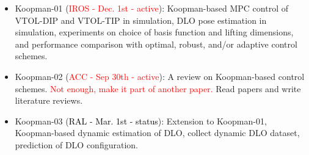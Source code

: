 \documentclass[11pt]{article}
\begin{document}
\begin{itemize}
  \item Koopman-01 (\textcolor{red}{IROS - Dec. 1st - active}):
  Koopman-based MPC control of VTOL-DIP and VTOL-TIP in simulation,
  DLO pose estimation in simulation,
  experiments on choice of basis function and lifting dimensions,
  and performance comparison with optimal, robust, and/or
  adaptive control schemes.\
  \item Koopman-02 (\textcolor{red}{ACC - Sep 30th - active}):
  A review on Koopman-based control schemes. \textcolor{red}{Not enough, make
  it part of another paper.} Read papers and write literature reviews.\

  \item Koopman-03 (\textcolor{black}{RAL - Mar. 1st - status}):
  Extension to Koopman-01, Koopman-based dynamic estimation of DLO,
  collect dynamic DLO dataset,
  prediction of DLO configuration.


\end{itemize}
\end{document}
